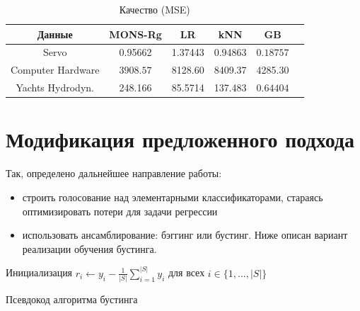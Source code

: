 \documentclass{article}
\begin{document}
\begin{table}[H]
\caption{Качество (MSE)}
\begin{center}
\begin{tabular}{|c|c|c|c|c|c|}
\hline
Данные & MONS-Rg & LR & kNN & GB \\
\hline
Servo               & 0.95662 & 1.37443  & 0.94863 & $\mathbf{0.18757}$\\
Computer Hardware  & $\mathbf{3908.57}$ & 8128.60 & 8409.37 & 4285.30\\
Yachts Hydrodyn.              & 248.166 & 85.5714 & 137.483 & $\mathbf{0.64404}$\\

\hline
\end{tabular}
\end{center}
\end{table}

\section{Модификация предложенного подхода}
Так, определено дальнейшее направление работы:
\begin{itemize}
  \item строить голосование над элементарными классификаторами, стараясь оптимизировать потери для задачи регрессии
  \item использовать ансамблирование: бэггинг или бустинг. Ниже описан вариант реализации обучения бустинга.
\end{itemize}

\begin{algorithm}[H]
\SetAlgoLined
{}
\BlankLine
Инициализация $r_i \leftarrow y_i - \frac{1}{|S|}\sum_{i=1}^{|S|}y_i$ для всех $i \in \{1, \ldots, |S|\}$\;
\caption{Псевдокод алгоритма бустинга}
\end{algorithm}
\end{document}
